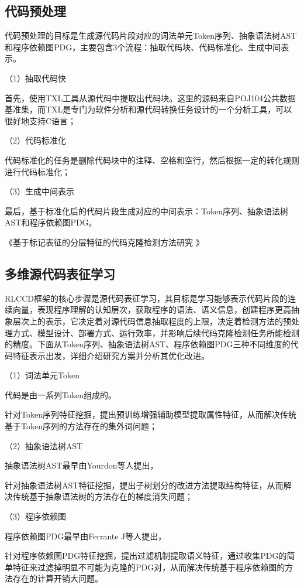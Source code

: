 \subsection{代码预处理}
\label{subsec:Preprocess}
代码预处理的目标是生成源代码片段对应的词法单元Token序列、抽象语法树AST和程序依赖图PDG，主要包含3个流程：抽取代码块、代码标准化、生成中间表示。

（1）抽取代码快

首先，使用TXL工具从源代码中提取出代码块。这里的源码来自POJ104公共数据基准集，而TXL是专门为软件分析和源代码转换任务设计的一个分析工具，可以很好地支持C语言；

（2）代码标准化

代码标准化的任务是删除代码块中的注释、空格和空行，然后根据一定的转化规则进行代码标准化；

（3）生成中间表示

最后，基于标准化后的代码片段生成对应的中间表示：Token序列、抽象语法树AST和程序依赖图PDG。

《基于标记表征的分层特征的代码克隆检测方法研究 》

\subsection{多维源代码表征学习}
\label{subsec:Representation}
RLCCD框架的核心步骤是源代码表征学习，其目标是学习能够表示代码片段的连续向量，表现程序理解的认知层次，获取程序的语法、语义信息，创建程序更高抽象层次上的表示，它决定着对源代码信息抽取程度的上限，决定着检测方法的预处理方式、模型设计、部署方式、运行效率，并影响后续代码克隆检测任务所能检测的精度。下面从Token序列、抽象语法树AST、程序依赖图PDG三种不同维度的代码特征表示出发，详细介绍研究方案并分析其优化改进。

（1）词法单元Token

代码是由一系列Token组成的。

针对Token序列特征挖掘，提出预训练增强辅助模型提取属性特征，从而解决传统基于Token序列的方法存在的集外词问题；

（2）抽象语法树AST

抽象语法树AST最早由Yourdon等人\cite{10.1145/1499949.1499997}提出，


针对抽象语法树AST特征挖掘，提出子树划分的改进方法提取结构特征，从而解决传统基于抽象语法树的方法存在的梯度消失问题；

（3）程序依赖图

程序依赖图PDG最早由Ferrante J等人\cite{10.1145/24039.24041}提出，


针对程序依赖图PDG特征挖掘，提出过滤机制提取语义特征，通过收集PDG的简单特征来过滤掉明显不可能为克隆的PDG对，从而解决传统基于程序依赖图的方法存在的计算开销大问题。


